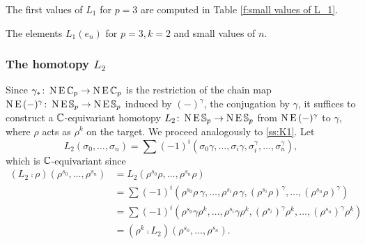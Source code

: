 The first values of $L_1$ for $p=3$ are computed in Table \ref{f:small values of L_1}.

\begin{table}
	\centering
	
	\caption{The elements $L_1(e_n)$ for $p=3, k=2$ and small values of $n$.}
	\label{f:small values of L_1}
\end{table}

\subsubsection{The homotopy $L_2$}

Since $\gamma_\ast \colon \operatorname{N}\operatorname{E}\mathbb{C}_p \to \operatorname{N}\operatorname{E}\mathbb{C}_p$ is the restriction of the chain map $\operatorname{N}\operatorname{E}\,(-)^\gamma \colon \operatorname{N}\operatorname{E}\mathbb{S}_p \to \operatorname{N}\operatorname{E}\mathbb{S}_p$ induced by $(-)^\gamma$, the conjugation by $\gamma$, it suffices to construct a $\mathbb{C}$-equivariant homotopy $L_2 \colon \operatorname{N}\operatorname{E}\mathbb{S}_p \to \operatorname{N}\operatorname{E}\mathbb{S}_p$ from $\operatorname{N}\operatorname{E}\,(-)^\gamma$ to $\gamma$, where $\rho$ acts as $\rho^k$ on the target.
We proceed analogously to \cref{ss:K1}.
Let
\[
L_2(\sigma_0,\dots,\sigma_n) = \sum (-1)^i (\sigma_0\gamma,\dots,\sigma_i\gamma,\sigma_i^\gamma,\dots,\sigma_n^\gamma),
\]
which is $\mathbb{C}$-equivariant since
\begin{align*}
	(L_2 \comp \rho)(\rho^{s_0},\dots,\rho^{s_n}) &=
	L_2(\rho^{s_0}\rho, \dots, \rho^{s_n}\rho) \\ &=
	\sum (-1)^i (\rho^{s_0} \rho\,\gamma,\dots,\rho^{s_i} \rho\,\gamma,(\rho^{s_i} \rho)^\gamma,\dots,(\rho^{s_n} \rho)^\gamma) \\ &=
	\sum (-1)^i (\rho^{s_0} \gamma \rho^k,\dots,\rho^{s_i} \gamma \rho^k,(\rho^{s_i})^\gamma \rho^k ,\dots,(\rho^{s_n})^\gamma \rho^k) \\ &=
	(\rho^k \comp L_2)(\rho^{s_0},\dots,\rho^{s_n}).
\end{align*}